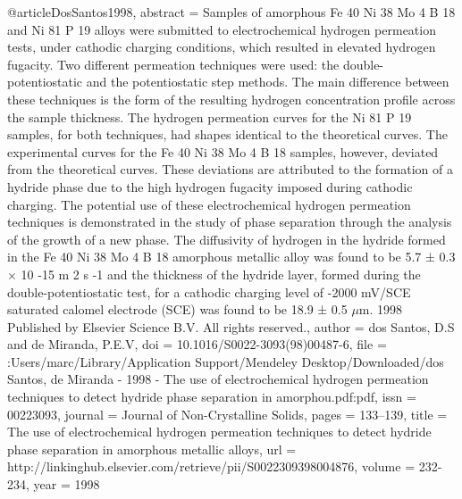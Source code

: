 @article{DosSantos1998,
abstract = {Samples of amorphous Fe 40 Ni 38 Mo 4 B 18 and Ni 81 P 19 alloys were submitted to electrochemical hydrogen permeation tests, under cathodic charging conditions, which resulted in elevated hydrogen fugacity. Two different permeation techniques were used: the double-potentiostatic and the potentiostatic step methods. The main difference between these techniques is the form of the resulting hydrogen concentration profile across the sample thickness. The hydrogen permeation curves for the Ni 81 P 19 samples, for both techniques, had shapes identical to the theoretical curves. The experimental curves for the Fe 40 Ni 38 Mo 4 B 18 samples, however, deviated from the theoretical curves. These deviations are attributed to the formation of a hydride phase due to the high hydrogen fugacity imposed during cathodic charging. The potential use of these electrochemical hydrogen permeation techniques is demonstrated in the study of phase separation through the analysis of the growth of a new phase. The diffusivity of hydrogen in the hydride formed in the Fe 40 Ni 38 Mo 4 B 18 amorphous metallic alloy was found to be 5.7 ± 0.3 × 10 -15 m 2 s -1 and the thickness of the hydride layer, formed during the double-potentiostatic test, for a cathodic charging level of -2000 mV/SCE saturated calomel electrode (SCE) was found to be 18.9 ± 0.5 $\mu$m. {\textcopyright} 1998 Published by Elsevier Science B.V. All rights reserved.},
author = {dos Santos, D.S and de Miranda, P.E.V},
doi = {10.1016/S0022-3093(98)00487-6},
file = {:Users/marc/Library/Application Support/Mendeley Desktop/Downloaded/dos Santos, de Miranda - 1998 - The use of electrochemical hydrogen permeation techniques to detect hydride phase separation in amorphou.pdf:pdf},
issn = {00223093},
journal = {Journal of Non-Crystalline Solids},
pages = {133--139},
title = {{The use of electrochemical hydrogen permeation techniques to detect hydride phase separation in amorphous metallic alloys}},
url = {http://linkinghub.elsevier.com/retrieve/pii/S0022309398004876},
volume = {232-234},
year = {1998}
}
